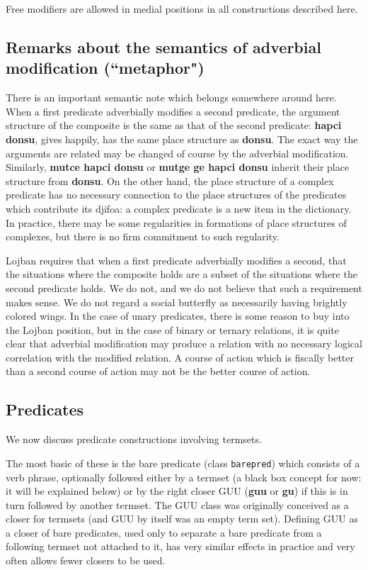 \documentclass[12pt]{book}
\begin{document}
Free modifiers are allowed in medial positions in all constructions described here.

\subsection{Remarks about the semantics of adverbial modification (``metaphor")}

There is an important semantic note which belongs somewhere around here.  When a first predicate adverbially modifies a second predicate, the argument structure of the composite is the same as that of the second predicate:  {\bf hapci donsu}, gives happily, has the same place structure as {\bf donsu}.  The exact way the arguments are related may be changed of course by the adverbial modification.   Similarly, {\bf mutce hapci donsu} or {\bf mutge ge hapci donsu} inherit their place structure from {\bf donsu}.  On the other hand, the place structure of a complex predicate
has no necessary connection to the place structures of the predicates which contribute its djifoa:  a complex predicate is a new item in the dictionary.  In practice, there may be some regularities in formations of place structures of complexes, but there is no firm commitment to such regularity.

Lojban requires that when a first predicate adverbially modifies a second, that the situations where the composite holds are a subset of the situations where the  second predicate holds.  We do not, and we do not believe that such a requirement makes sense.  We do not regard a social butterfly as necessarily having brightly colored wings.  In the case of unary predicates, there is some reason to buy into the Lojban position, but in the case of binary or ternary relations, it is quite clear that adverbial modification may produce a relation with no necessary logical correlation with the modified relation.  A course of action which is fiscally better than a second course of action may not be the better course of action.

\subsection{Predicates}

We now discuss predicate constructions involving termsets.

The most basic of these is the bare predicate (class {\tt barepred}) which consists of a verb phrase, optionally  followed either by a termset (a black box concept for now:  it will be explained below) or by the right closer GUU ({\bf guu} or {\bf gu}) if this is in turn followed by another termset.  The GUU class was originally conceived as a closer for termsets (and GUU by itself was an empty term set).  Defining GUU as a closer of bare predicates, used only to separate
a bare predicate from a following termset not attached to it, has very similar effects in practice and very often allows fewer closers to be used.
\end{document}
